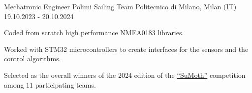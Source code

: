 
\cventry
{Mechatronic Engineer}
{Polimi Sailing Team}
{Politecnico di Milano, Milan (IT)}
{19.10.2023 - 20.10.2024}
{
    \begin{cvitems}
        \item {Coded from scratch high performance NMEA0183 libraries.}
        \item {Worked with STM32 microcontrollers to create interfaces for the sensors and the control algorithms.}
        \item {Selected as the overall winners of the 2024 edition of the \href{https://sumoth.org/}{``SuMoth''} competition among 11 participating teams.}
    \end{cvitems}
}